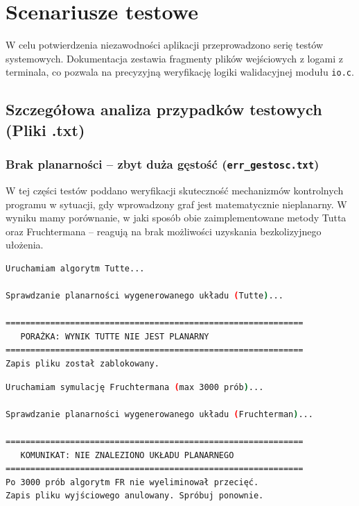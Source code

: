 \documentclass[12pt,a4paper]{article}
\begin{document}
\newpage

\section{Scenariusze testowe}

W celu potwierdzenia niezawodności aplikacji przeprowadzono serię testów systemowych. Dokumentacja zestawia fragmenty plików wejściowych z logami z terminala, co pozwala na precyzyjną weryfikację logiki walidacyjnej modułu \texttt{io.c}.

\subsection{Szczegółowa analiza przypadków testowych (Pliki .txt)\\}

\subsubsection{Brak planarności – zbyt duża gęstość (\texttt{err\_gestosc.txt})}
W tej części testów poddano weryfikacji skuteczność mechanizmów kontrolnych programu w sytuacji, gdy wprowadzony graf jest matematycznie nieplanarny. W wyniku mamy porównanie, w jaki sposób obie zaimplementowane metody Tutta oraz Fruchtermana – reagują na brak możliwości uzyskania bezkolizyjnego ułożenia.
\begin{lstlisting}[language=bash, caption={Log terminala - wynik działania algorytmu Tutte}]
Uruchamiam algorytm Tutte...

Sprawdzanie planarności wygenerowanego układu (Tutte)...

============================================================
   PORAŻKA: WYNIK TUTTE NIE JEST PLANARNY    
============================================================
Zapis pliku został zablokowany.


\end{lstlisting}
\begin{lstlisting}[language=bash, caption={Log terminala - wynik działania algorytmu Fruchtermana}]
Uruchamiam symulację Fruchtermana (max 3000 prób)...

Sprawdzanie planarności wygenerowanego układu (Fruchterman)...

============================================================
   KOMUNIKAT: NIE ZNALEZIONO UKŁADU PLANARNEGO    
============================================================
Po 3000 prób algorytm FR nie wyeliminował przecięć.
Zapis pliku wyjściowego anulowany. Spróbuj ponownie.


\end{lstlisting}
\newpage
\end{document}
